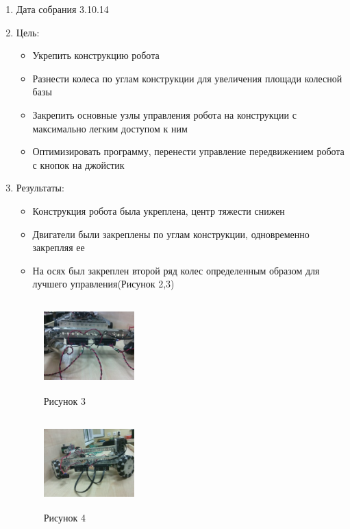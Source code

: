 
\begin{enumerate}
		\item Дата собрания 3.10.14
		\item Цель:
		\begin{itemize}
			\item Укрепить конструкцию робота
			\item Разнести колеса по углам конструкции для увеличения площади колесной базы
			\item Закрепить основные узлы управления робота на конструкции с максимально легким доступом к ним
			\item Оптимизировать программу, перенести управление передвижением робота с кнопок на джойстик
		\end{itemize}
		\item Результаты:
		\begin{itemize}
			\item Конструкция робота была укреплена, центр тяжести снижен 
			\item Двигатели были закреплены по углам конструкции, одновременно закрепляя ее
			\item На осях был закреплен второй ряд колес определенным образом для лучшего управления(Рисунок 2,3)
		\end{itemize}
		\begin{figure} [h]
			\centering
			\begin{minipage}{0.3\linewidth}
				\includegraphics[width=35mm,height=35mm]{Days/3.10.14/3_1_robot}\\ Рисунок 3
			\end{minipage}
			\begin{minipage}{0.3\linewidth}
				\includegraphics[width=35mm,height=35mm]{Days/3.10.14/3_2_robot}\\ Рисунок 4

\end{minipage}
\end{figure}
\end{enumerate}
